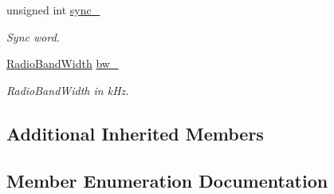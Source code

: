 \begin{DoxyCompactItemize}
unsigned int \hyperlink{classo_cpt_1_1_lo_ra_a42f093f868ce1b8d4525031569b77c19}{sync\+\_\+}
\begin{DoxyCompactList}\small\item\em Sync word. \end{DoxyCompactList}\item 
\hyperlink{classo_cpt_1_1_lo_ra_a37ef012dc7d97a8825917dc84ddc6f4c}{Radio\+Band\+Width} \hyperlink{classo_cpt_1_1_lo_ra_a687ca4712f0976534dcdaec0b068d9e5}{bw\+\_\+}
\begin{DoxyCompactList}\small\item\em Radio\+Band\+Width in k\+Hz. \end{DoxyCompactList}\end{DoxyCompactItemize}
\subsection*{Additional Inherited Members}


\subsection{Member Enumeration Documentation}
